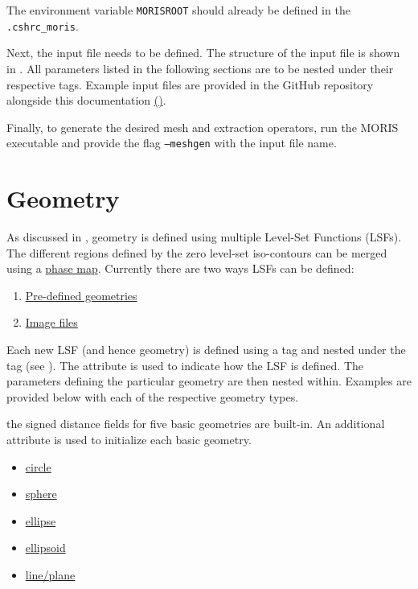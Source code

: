 \vspace{-0.5cm}

The environment variable \texttt{MORISROOT} should already be defined in the \texttt{.cshrc\_moris}.

Next, the input file needs to be defined. The structure of the input file is shown in . All parameters listed in the following sections are to be nested under their respective tags. Example input files are provided in the GitHub repository alongside this documentation \href{https://github.com/kkmaute/moris/tree/main/share/doc/mesh_generation/examples}{(\ExternalLink)}.

Finally, to generate the desired mesh and extraction operators, run the MORIS executable and provide the flag \texttt{---meshgen} with the input file name. 



\section{Geometry}
\label{sec:tutorial_geometry}

As discussed in , geometry is defined using multiple Level-Set Functions (LSFs). The different regions defined by the zero level-set iso-contours can be merged using a \hyperlink{phase_map}{phase map}. Currently there are two ways LSFs can be defined:
\begin{enumerate}
    \item \hyperlink{pre_defined}{Pre-defined geometries}
    \item \hyperlink{image_file}{Image files}
\end{enumerate}
Each new LSF (and hence geometry) is defined using a  tag and nested under the  tag (see ). The  attribute is used to indicate how the LSF is defined. The parameters defining the particular geometry are then nested within. Examples are provided below with each of the respective geometry types.

 the signed distance fields for five basic geometries are built-in. An additional  attribute is used to initialize each basic geometry.
\begin{multicols}{3}
\begin{itemize}
    \item \hyperlink{circle}{circle}
    \item \hyperlink{sphere}{sphere}
    \item \hyperlink{ellipse}{ellipse}
    \item \hyperlink{ellipsoid}{ellipsoid}
    \item \hyperlink{plane}{line/plane}
\end{itemize}
\end{multicols}

